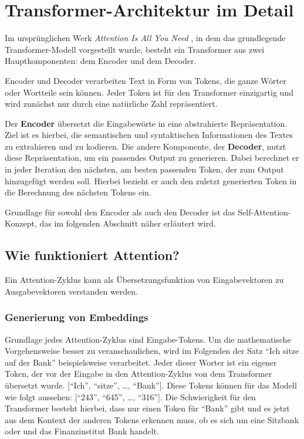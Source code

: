 \chapter{Transformer-Architektur im Detail}

Im ursprünglichen Werk \textit{Attention Is All You Need} , in dem das grundlegende Transformer-Modell vorgestellt wurde, besteht ein Transformer aus zwei Hauptkomponenten: 
dem Encoder und dem Decoder. 

Encoder und Decoder verarbeiten Text in Form von Tokens, die ganze Wörter oder Wortteile sein können. 
Jeder Token ist für den Transformer einzigartig und wird zunächst nur durch eine natürliche Zahl repräsentiert. 

Der \textbf{Encoder} übersetzt die Eingabewörte in eine abstrahierte Repräsentation.
Ziel ist es hierbei, die semantischen und syntaktischen Informationen des Textes zu extrahieren und zu kodieren.  
Die andere Komponente, der \textbf{Decoder}, nutzt diese Repräsentation, um ein passendes Output zu generieren. 
Dabei berechnet er in jeder Iteration den nächsten, am besten passenden Token, der zum Output hinzugefügt werden soll. 
Hierbei bezieht er auch den zuletzt generierten Token in die Berechnung des nächsten Tokens ein.

Grundlage für sowohl den Encoder als auch den Decoder ist das Self-Attention-Konzept, das im folgenden Abschnitt näher erläutert wird.

\section{Wie funktioniert Attention?}

Ein Attention-Zyklus kann als Übersetzungsfunktion von Eingabevektoren zu Ausgabevektoren verstanden werden.

\subsection{Generierung von Embeddings}

Grundlage jedes Attention-Zyklus sind Eingabe-Tokens. 
Um die mathematische Vorgehensweise besser zu veranschaulichen, wird im Folgenden der Satz \enquote{Ich sitze auf der Bank} beispielsweise verarbeitet.
Jeder dieser Worter ist ein eigener Token, der vor der Eingabe in den Attention-Zyklus von dem Transformer übersetzt wurde.
[\enquote{Ich}, \enquote{sitze}, \dots, \enquote{Bank}]. 
Diese Tokens können für das Modell wie folgt aussehen: [\enquote{243}, \enquote{645}, \dots, \enquote{316}].
Die Schwierigkeit für den Transformer besteht hierbei, dass nur einen Token für \enquote{Bank} gibt und es jetzt aus dem Kontext der anderen Tokens erkennen muss, ob es sich um eine Sitzbank oder und das Finanzinstitut Bank handelt.


